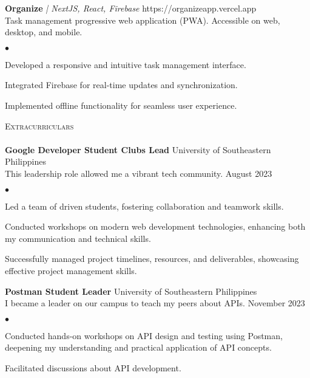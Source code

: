 \documentclass[a4paper]{article}
\newcommand{\lineunder} {
        \vspace*{-8pt} \\
        \hspace*{-18pt} \hrulefill \\
    }
\newcommand{\header} [1] {
        {\vspace*{4mm} \hspace*{-18pt}\vspace*{8pt} \textsc{#1}}
        \vspace*{-6pt} \lineunder
    }
\newenvironment{achievements}{
        \begin{list}
            {$\bullet$}{\topsep 0pt \itemsep -2pt}}{\vspace*{4pt}
        \end{list}
    }
\begin{document}
    {\textbf{Organize}} {\sl | NextJS, React, Firebase} \hfill https://organizeapp.vercel.app\\
    \vspace{1mm}
    Task management progressive web application (PWA). Accessible on web, desktop, and mobile.\\
    \begin{achievements}
        \item Developed a responsive and intuitive task management interface.
        \item Integrated Firebase for real-time updates and synchronization.
        \item Implemented offline functionality for seamless user experience.
    \end{achievements}

\header{Extracurriculars}
\textbf{Google Developer Student Clubs Lead} \hfill University of Southeastern Philippines\\
\vspace{1mm}
This leadership role allowed me a vibrant tech community. \hfill August 2023\\
\begin{achievements}
    \item Led a team of driven students, fostering collaboration and teamwork skills.
    \item Conducted workshops on modern web development technologies, enhancing both my communication and technical skills.
    \item Successfully managed project timelines, resources, and deliverables, showcasing effective project management skills.
\end{achievements}
\vspace*{2mm}
\textbf{Postman Student Leader} \hfill University of Southeastern Philippines\\
\vspace{1mm}
I became a leader on our campus to teach my peers about APIs. \hfill November 2023\\
\begin{achievements}
    \item Conducted hands-on workshops on API design and testing using Postman, deepening my understanding and practical application of API concepts.
    \item Facilitated discussions about API development.
\end{achievements}
\end{document}
